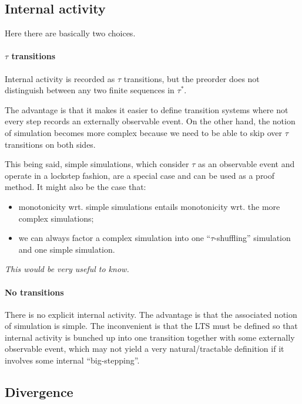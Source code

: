 \documentclass[11pt]{article}
\begin{document}
\subsection{Internal activity} %

Here there are basically two choices.

\paragraph{$\tau$ transitions}

Internal activity is recorded as $\tau$ transitions,
but the preorder does not distinguish
between any two finite sequences in $\tau^*$.

The advantage is that it makes it easier to define
transition systems where not every step
records an externally observable event.
On the other hand,
the notion of simulation becomes more complex
because we need to be able to skip over
$\tau$ transitions on both sides.

This being said, simple simulations,
which consider $\tau$ as an observable event
and operate in a lockstep fashion,
are a special case and can be used as a proof method.
It might also be the case that:
\begin{itemize}
  \item monotonicity wrt. simple simulations
    entails monotonicity wrt. the more complex simulations;
  \item we can always factor a complex simulation into
    one ``$\tau$-shuffling'' simulation and
    one simple simulation.
\end{itemize}
\emph{This would be very useful to know.}

\paragraph{No transitions}

There is no explicit internal activity.
The advantage is that
the associated notion of simulation is simple.
The inconvenient is that
the LTS must be defined so that
internal activity is bunched up into one transition
together with some externally observable event,
which may not yield a very natural/tractable definition
if it involves some internal ``big-stepping''.


\subsection{Divergence} %
\end{document}
